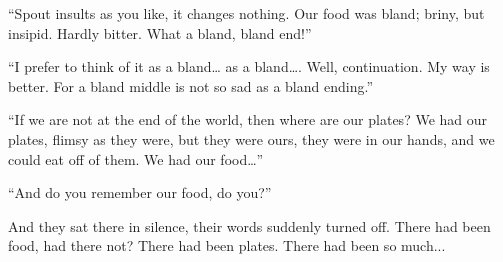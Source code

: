 ``Spout insults as you like, it changes nothing. Our food was bland;
briny, but insipid. Hardly bitter. What a bland, bland end!''

``I prefer to think of it as a bland\ldots{} as a bland\ldots{}. Well,
continuation. My way is better. For a bland middle is not so sad as a
bland ending.''

``If we are not at the end of the world, then where are our plates? We
had our plates, flimsy as they were, but they were ours, they were in
our hands, and we could eat off of them. We had our food\ldots{}''

``And do you remember our food, do you?''

And they sat there in silence, their words suddenly turned off. There
had been food, had there not? There had been plates. There had been so
much...
